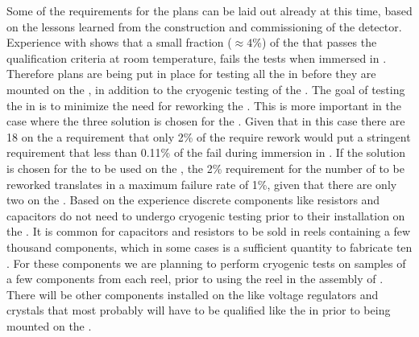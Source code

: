Some of the requirements for the  plans can
be laid out already at this time, based on the lessons learned
from the construction and commissioning of the 
detector. Experience with  shows that a small fraction
($\approx4$\%) of the   that passes the
qualification criteria at room temperature, fails the tests
when immersed in \lntwo. Therefore plans are being put
in place for testing all the  in \lntwo
before they are mounted on the , in addition to the
cryogenic testing of the . The goal of testing 
the  in \lntwo is to minimize the need
for reworking the . This is more important in the
case where the three  solution is chosen for the
. Given that in this case there are 18  on the
 a requirement that only 2\% of the 
require rework would put a stringent requirement that less than
0.11\% of the  fail during immersion in \lntwo.
If the  solution is chosen for the 
to be used on the , the 2\% requirement for the
number of  to be reworked translates in a 
maximum failure rate of 1\%, given that there are only two
 on the . Based on the 
experience discrete components like resistors and capacitors
do not need to undergo cryogenic testing prior to their installation
on the . It is common for capacitors and resistors
to be sold in reels containing a few thousand components, which
in some cases is a sufficient quantity to fabricate ten
. For these components we are planning to
perform cryogenic tests on samples of a few components
from each reel, prior to using the reel in the assembly of
. There will be other components installed on
the  like voltage regulators and crystals that
most probably will have to be qualified like the 
in \lntwo prior to being mounted on the .


